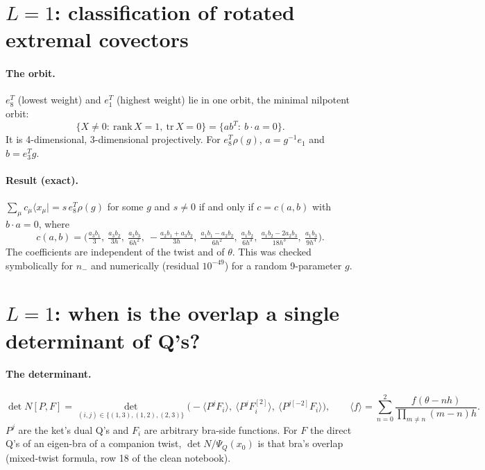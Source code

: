 \documentclass[11pt]{article}
\newcommand{\bra}[1]{\langle #1|}
\begin{document}
\section{$L=1$: classification of rotated extremal covectors}

\paragraph{The orbit.} $e_8^T$ (lowest weight) and $e_1^T$ (highest weight) lie in one orbit, the minimal nilpotent orbit:
\[
\{X\neq0:\ \mathrm{rank}\,X=1,\ \mathrm{tr}\,X=0\}=\{ab^T:\ b\cdot a=0\}.
\]
It is 4-dimensional, 3-dimensional projectively. For $e_8^T\rho(g)$, $a=g^{-1}e_1$ and $b=e_3^Tg$.

\paragraph{Result (exact).} $\sum_\mu c_\mu\bra{x_\mu}=s\,e_8^T\rho(g)$ for some $g$ and $s\neq0$ if and only if $c=c(a,b)$ with $b\cdot a=0$, where
\[
c(a,b)=\Big(\tfrac{a_3b_1}{3},\ \tfrac{a_3b_2}{3h},\ \tfrac{a_3b_3}{6h^2},\ -\tfrac{a_2b_1+a_3b_2}{3h},\ \tfrac{a_1b_1-a_2b_2}{6h^2},\ \tfrac{a_1b_2}{6h^3},\ \tfrac{a_1b_2-2a_2b_3}{18h^3},\ \tfrac{a_1b_3}{9h^4}\Big).
\]
The coefficients are independent of the twist and of $\theta$. This was checked symbolically for $n_-$ and numerically (residual $10^{-49}$) for a random 9-parameter $g$.

\section{$L=1$: when is the overlap a single determinant of Q's?}\label{sec:onedet}

\paragraph{The determinant.}
\[
\det N[P,F]=\det_{(i,j)\in\{(1,3),(1,2),(2,3)\}}\Big(-\langle P^jF_i\rangle,\ \langle P^jF_i^{[2]}\rangle,\ \langle P^{j[-2]}F_i\rangle\Big),\qquad
\langle f\rangle=\sum_{n=0}^{2}\frac{f(\theta-nh)}{\prod_{m\neq n}(m-n)h}.
\]
$P^j$ are the ket's dual Q's and $F_i$ are arbitrary bra-side functions. For $F$ the direct Q's of an eigen-bra of a companion twist, $\det N/\Psi_Q(x_0)$ is that bra's overlap (mixed-twist formula, row 18 of the clean notebook).
\end{document}
